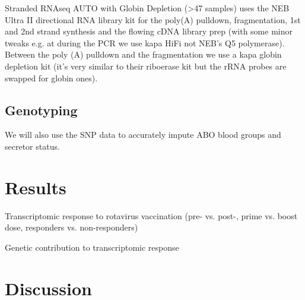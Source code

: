 Stranded RNAseq AUTO with Globin Depletion (>47 samples) uses the NEB Ultra
II directional RNA library kit for the poly(A) pulldown, fragmentation, 1st and
2nd strand synthesis and the flowing cDNA library prep (with some minor tweaks
e.g. at during the PCR we use kapa HiFi not NEB's Q5 polymerase). Between the
poly (A) pulldown and the fragmentation we use a kapa globin depletion kit
(it's very similar to their riboerase kit but the rRNA probes are swapped for
globin ones).

\subsection{Genotyping}

We will also use the SNP data to accurately impute ABO blood groups and secretor status. 

\section{Results}

Transcriptomic response to rotavirus vaccination (pre- vs. post-, prime vs. boost dose, responders vs. non-responders)

Genetic contribution to transcriptomic response

\section{Discussion}

